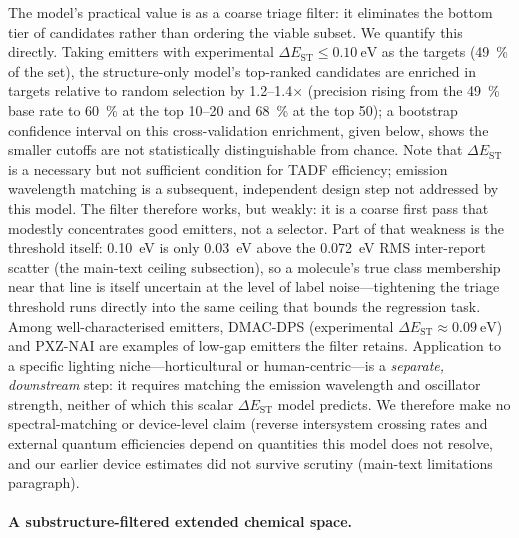 \documentclass[final,3p,times,twocolumn]{elsarticle}
\begin{document}
The model's practical value is as a coarse triage filter: it eliminates the bottom
tier of candidates rather than ordering the viable subset. We quantify this directly. Taking emitters with experimental
$\Delta E_\text{ST}\le\qty{0.10}{\electronvolt}$ as the targets (\qty{49}{\percent}
of the set), the structure-only model's top-ranked candidates are enriched in
targets relative to random selection by \numrange{1.2}{1.4}$\times$
(precision rising from the \qty{49}{\percent} base rate to \qty{60}{\percent} at
the top \num{10}--\num{20} and \qty{68}{\percent} at the top \num{50}); a bootstrap
confidence interval on this cross-validation enrichment, given below, shows the smaller cutoffs are
not statistically distinguishable from chance.
Note that $\Delta E_\text{ST}$ is a necessary but not sufficient condition for TADF
efficiency; emission wavelength matching is a subsequent, independent design step
not addressed by this model.
The filter therefore works, but weakly: it is a coarse
first pass that modestly concentrates good emitters, not a selector. Part of that
weakness is the threshold itself: \qty{0.10}{\electronvolt} is only
\qty{0.03}{\electronvolt} above the \qty{0.072}{\electronvolt} RMS inter-report
scatter (the main-text ceiling subsection), so a molecule's true class membership near that
line is itself uncertain at the level of label noise---tightening the triage
threshold runs directly into the same ceiling that bounds the regression task.
Among well-characterised emitters, DMAC-DPS
(experimental $\Delta E_\text{ST}\approx\qty{0.09}{\electronvolt}$) and PXZ-NAI are
examples of low-gap emitters the filter retains.
Application to a specific lighting niche---horticultural or human-centric---is a
\emph{separate, downstream} step: it requires matching the emission wavelength and
oscillator strength, neither of which this scalar $\Delta E_\text{ST}$ model predicts.
We therefore make no spectral-matching or device-level claim (reverse intersystem
crossing rates and external quantum efficiencies depend on quantities this model does
not resolve, and our earlier device estimates did not survive scrutiny
(main-text limitations paragraph).

\paragraph{A substructure-filtered extended chemical space.}
\end{document}
